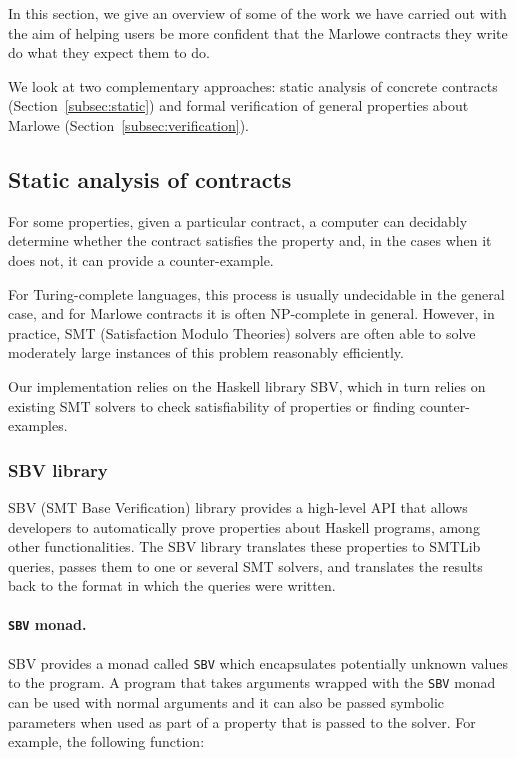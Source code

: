 \documentclass[runningheads]{llncs}
\begin{document}
In this section, we give an overview of some of the work we have carried out with the aim of helping users be more confident that the Marlowe contracts they write do what they expect them to do.

We look at two complementary approaches: static analysis of concrete contracts (Section~\ref{subsec:static}) and formal verification of general properties about Marlowe (Section~\ref{subsec:verification}).

\subsection{Static analysis of contracts\label{subsec:static}}

For some properties, given a particular contract, a computer can decidably determine whether the contract satisfies the property and, in the cases when it does not, it can provide a counter-example.

For Turing-complete languages, this process is usually undecidable in the general case, and for Marlowe contracts it is often NP-complete in general. However, in practice, SMT (Satisfaction Modulo Theories) solvers are often able to solve moderately large instances of this problem reasonably efficiently.

Our implementation relies on the Haskell library SBV, which in turn relies on existing SMT solvers to check satisfiability of properties or finding counter-examples.

\subsubsection{SBV library}

SBV \cite{SBV} (SMT Base Verification) library provides a high-level API that allows developers to automatically prove properties about Haskell programs, among other functionalities. 
The SBV library translates these properties to SMTLib queries, passes them to one or several SMT solvers, and translates the results back to the format in which the queries were written.

\paragraph{\texttt{SBV} monad.}

SBV provides a monad called \texttt{SBV} which encapsulates potentially unknown values to the program. A program that takes arguments wrapped with the \texttt{SBV} monad can be used with normal arguments and it can also be passed symbolic parameters when used as part of a property that is passed to the solver.
For example, the following function:
\end{document}
